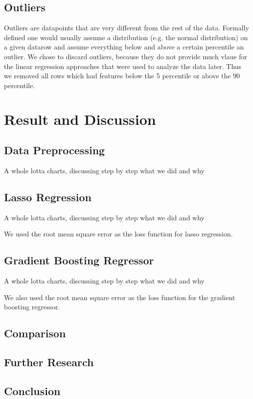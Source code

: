 \documentclass{article}
\begin{document}
\subsection{Outliers}
Outliers are datapoints that are very different from the rest of the data. Formally defined one would usually assume a distribution (e.g. the normal distribution) on a given datarow and assume everything below and above a certain percentile an outlier.
 We chose to discard outliers, because they do not provide much vlaue for the linear regression approaches that were used to analyze the data later. Thus we removed all rows which had features below the 5 percentile or above the 90 percentile.\newline
\section{Result and Discussion}
\subsection{Data Preprocessing}
A whole lotta charts, discussing step by step what we did and why
\subsection{Lasso Regression}
A whole lotta charts, discussing step by step what we did and why

We used the root mean square error as the loss function for lasso regression.
\subsection{Gradient Boosting Regressor}
A whole lotta charts, discussing step by step what we did and why

We also used the root mean square error as the loss function for the gradient boosting regressor.
\subsection{Comparison}

\subsection{Further Research}
\subsection{Conclusion}

{}

\end{document}
